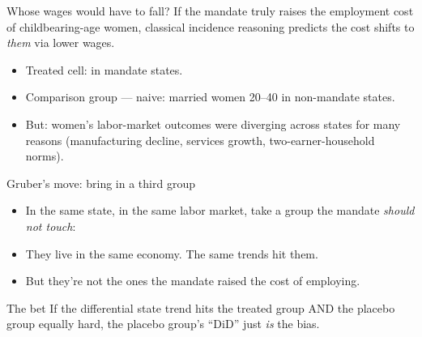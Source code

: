 \documentclass[aspectratio=169,11pt]{beamer}
\begin{document}
\begin{frame}{Whose wages would have to fall?}
\vspace{0.4em}
If the mandate truly raises the employment cost of childbearing-age women, classical incidence reasoning predicts the cost shifts to \textit{them} via lower wages.
\vspace{0.6em}
\begin{itemize}
  \item Treated cell:  in mandate states.
  \item Comparison group --- naive: married women 20--40 in non-mandate states.
  \item But: women's labor-market outcomes were diverging across states for many reasons (manufacturing decline, services growth, two-earner-household norms). 
\end{itemize}
\end{frame}

\begin{frame}{Gruber's move: bring in a third group}
\vspace{0.4em}
\begin{itemize}
  \item In the same state, in the same labor market, take a group the mandate \textit{should not touch}: 
  \item They live in the same economy. The same trends hit them.
  \item But they're not the ones the mandate raised the cost of employing.
\end{itemize}
\vspace{0.6em}
\begin{block}{The bet}
\small
If the differential state trend hits the treated group AND the placebo group equally hard, the placebo group's ``DiD'' just \textit{is} the bias. \\[0.2em]
\end{block}
\end{frame}

\end{document}
